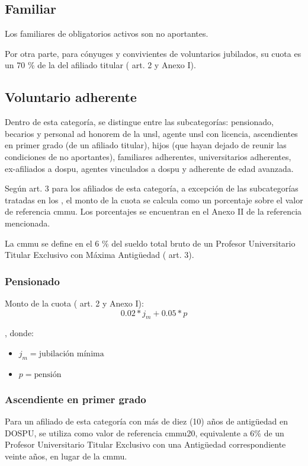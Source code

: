 \subsection{Familiar} \label{sec:familiar}
Los familiares de obligatorios activos son no aportantes.

Por otra parte, para cónyuges y convivientes de voluntarios jubilados, su cuota es un 70 \% de la del afiliado titular (\cite{dospuRes21} art. 2 y Anexo I).

\subsection{Voluntario adherente} \label{sec:adherente}
Dentro de esta categoría, se distingue entre las subcategorías: pensionado, becarios y personal ad honorem de la \acrshort{unsl}, agente \acrshort{unsl} con licencia, ascendientes en primer grado (de un afiliado titular), hijos (que hayan dejado de reunir las condiciones de no aportantes), familiares adherentes, universitarios adherentes, ex-afiliados a \acrshort{dospu}, agentes vinculados a \acrshort{dospu} y adherente de edad avanzada.

Según \cite{dospuRes21} art. 3 para los afiliados de esta categoría, a excepción de las subcategorías tratadas en los , el monto de la cuota se calcula como un porcentaje sobre el valor de referencia \acrshort{cmmu}. Los porcentajes se encuentran en el Anexo II de la referencia mencionada.

La \acrfull{cmmu} se define en el 6 \% del sueldo total bruto de un Profesor Universitario Titular Exclusivo con Máxima Antigüedad (\cite{dospuRes21} art. 3).

\subsubsection{Pensionado}\label{sssec:pensionado}
Monto de la cuota (\cite{dospuRes21} art. 2 y Anexo I):
\begin{displaymath}
0.02 * j_m + 0.05 * p
\end{displaymath}

, donde:
\begin{itemize}
    \item $j_m = \text{jubilación mínima}$
    \item $p = \text{pensión}$
\end{itemize}

\subsubsection{Ascendiente en primer grado}
Para un afiliado de esta categoría con más de diez (10) años de antigüedad en DOSPU, se utiliza como valor de referencia \acrshort{cmmu}20, equivalente a 6\% de un Profesor Universitario Titular Exclusivo con una Antigüedad correspondiente veinte años, en lugar de la \acrshort{cmmu}\cite{dospuRes60}.

